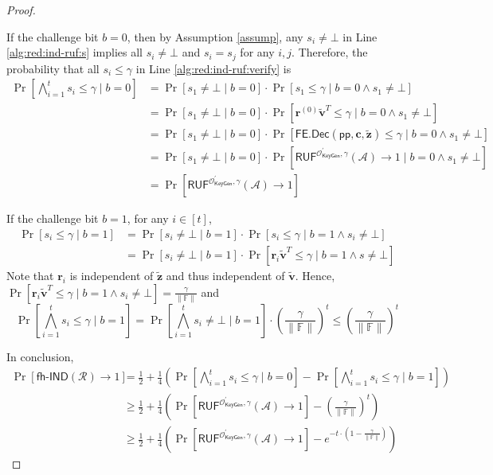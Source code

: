\begin{proof}
\begin{figure}[h]
\end{figure}


If the challenge bit $b = 0$, then by Assumption \ref{assump}, any $s_i \neq \bot$ in Line \ref{alg:red:ind-ruf:s} implies all $s_i \neq \bot$ and $s_i = s_j$ for any $i, j$. Therefore, the probability that all $s_i \leq \gamma$ in Line \ref{alg:red:ind-ruf:verify} is
\begin{align*}
	\Pr\left[ \bigwedge_{i=1}^t s_i \leq \gamma \mid b = 0 \right]
	&= \Pr\left[ s_1 \neq \bot \mid b = 0 \right] \cdot \Pr \left[ s_1 \leq \gamma \mid b = 0 \wedge s_1 \neq \bot \right] \\
	&= \Pr \left[ s_1 \neq \bot \mid b = 0 \right] \cdot \Pr \left[ \mathbf{r}^{(0)} \mathbf{\tilde{v}}^T \leq \gamma \mid b = 0 \wedge s_1 \neq \bot \right] \\
	&= \Pr \left[s_1 \neq \bot \mid b = 0 \right] \cdot \Pr \left[ \textsf{FE.Dec}(\textsf{pp}, \mathbf{c}, \mathbf{\tilde{z}}) \leq \gamma \mid b = 0 \wedge s_1 \neq \bot \right] \\
	&= \Pr \left[s_1 \neq \bot \mid b = 0 \right] \cdot \Pr \left[ \textsf{RUF}^{\mathcal{O}^\prime_{\textsf{KeyGen}}, \gamma}(\mathcal{A}) \to 1 \mid b = 0 \wedge s_1 \neq \bot \right] \\ 
	&= \Pr \left[ \textsf{RUF}^{\mathcal{O}^\prime_{\textsf{KeyGen}}, \gamma}(\mathcal{A}) \to 1 \right] 
\end{align*}

If the challenge bit $b = 1$, for any $i \in [t]$,
\begin{align*}
	\Pr[ s_i \leq \gamma \mid b = 1 ]
	&= \Pr[s_i \neq \bot \mid b = 1] \cdot \Pr[ s_i \leq \gamma \mid b = 1 \wedge s_i \neq \bot] \\
	&= \Pr[s_i \neq \bot \mid b = 1] \cdot \Pr[ \mathbf{r}_i \mathbf{\tilde{v}}^T \leq \gamma \mid b = 1 \wedge s \neq \bot]
\end{align*}
Note that $\mathbf{r}_i$ is independent of $\mathbf{\tilde{z}}$ and thus independent of $\mathbf{\tilde{v}}$. Hence, $\Pr[\mathbf{r}_i \mathbf{\tilde{v}}^T \leq \gamma \mid b = 1 \wedge s_i \neq \bot] = \frac{\gamma}{\| \mathbb{F} \|}$ and
\[
	\Pr \left[ \bigwedge_{i=1}^t s_i \leq \gamma \mid b = 1 \right] = \Pr \left[ \bigwedge_{i=1}^t s_i \neq \bot \mid b = 1 \right] \cdot \left( \frac{\gamma}{\| \mathbb{F} \|} \right)^t \leq \left( \frac{\gamma}{\| \mathbb{F} \|} \right)^t
\]

In conclusion,
\begin{align*}
	\Pr[\textsf{fh-IND}(\mathcal{R}) \to 1] 
	&= \frac{1}{2} + \frac{1}{4} \left( \Pr \left[ \bigwedge_{i=1}^t s_i \leq \gamma \mid b = 0 \right] - \Pr \left[ \bigwedge_{i=1}^t s_i \leq \gamma \mid b = 1 \right] \right) \\
	&\geq \frac{1}{2} + \frac{1}{4} \left( \Pr[ \textsf{RUF}^{\mathcal{O}^\prime_{\textsf{KeyGen}}, \gamma}(\mathcal{A}) \to 1] - \left( \frac{\gamma}{\| \mathbb{F} \|} \right)^t \right) \\
	&\geq \frac{1}{2} + \frac{1}{4} \left( \Pr[ \textsf{RUF}^{\mathcal{O}^\prime_{\textsf{KeyGen}}, \gamma}(\mathcal{A}) \to 1] -  e^{- t \cdot (1 - \frac{\gamma}{\| \mathbb{F} \|}) } \right)
\end{align*}


\end{proof}
